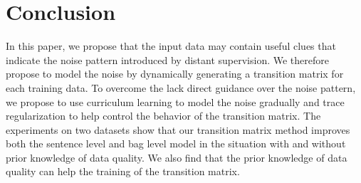 \section{Conclusion}
In this paper, we propose that the input data may contain useful clues that indicate the noise pattern introduced by distant supervision. We therefore propose to model the noise by dynamically generating a transition matrix for each training data. To overcome the lack direct guidance over the noise pattern, we propose to use curriculum learning to model the noise gradually and trace regularization to help control the behavior of the transition matrix. The experiments on two datasets show that our transition matrix method improves both the sentence level and bag level model in the situation with and without prior knowledge of data quality. We also find that the prior knowledge of data quality can help the training of the transition matrix. 
